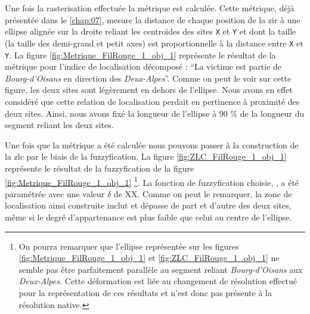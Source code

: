 Une fois la rasterisation effectuée la métrique
 est calculée. Cette métrique, déjà
présentée dans le \autoref{chap:07}, mesure la distance de chaque
position de la \ac{zir} à une ellipse alignée sur la droite reliant
les centroïdes des sites \texttt{X} et \texttt{Y} et dont la taille
(\ie la taille des demi-grand et petit axes) est proportionnelle à la
distance entre \texttt{X} et \texttt{Y}. La figure
\ref{fig:Metrique_FilRouge_1_obj_1} représente le résultat de la
métrique pour l'indice de localisation décomposé : \enquote{La victime
  est partie de \emph{Bourg-d'Oisans} en direction des
  \emph{Deux-Alpes}}. Comme on peut le voir sur cette figure, les deux
sites sont légèrement en dehors de l'ellipse. Nous avons en effet
considéré que cette relation de localisation perdait en pertinence à
proximité des deux sites. Ainsi, nous avons fixé la longueur de
l'ellipse à 90 \% de la longueur du segment reliant les deux sites.

Une fois que la métrique a été calculée nous pouvons passer à la
construction de la \ac{zlc} par le biais de la fuzzyfication. La
figure \ref{fig:ZLC_FilRouge_1_obj_1} représente le résultat de la
fuzzyfication de la figure \ref{fig:Metrique_FilRouge_1_obj_1}
\footnote{On pourra remarquer que l'ellipse représentée sur les
  figures \ref{fig:Metrique_FilRouge_1_obj_1} et
  \ref{fig:ZLC_FilRouge_1_obj_1} ne semble pas être parfaitement
  parallèle au segment reliant \emph{Bourg-d'Oisans} aux
  \emph{Deux-Alpes.} Cette déformation est liée au changement de
  résolution effectué pour la représentation de ces résultats et n'est
  donc pas présente à la résolution native.}.
%
La fonction de fuzzyfication choisie, , a été
paramétrée avec une valeur \(\delta\) de XX.
%
Comme on peut le remarquer, la zone de localisation ainsi construite
inclut et dépasse de part et d'autre des deux sites, même si le degré
d'appartenance est plus faible que celui au centre de l'ellipse. 



